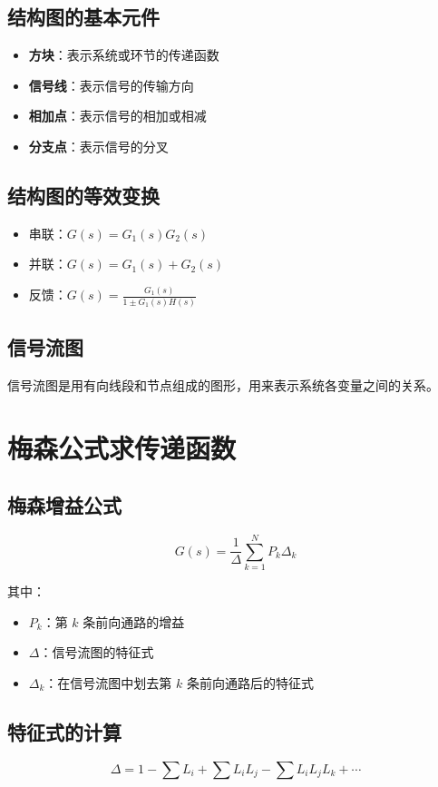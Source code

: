 \documentclass[12pt,a4paper]{article}
\begin{document}
\subsection{结构图的基本元件}
\begin{itemize}
    \item \textbf{方块}：表示系统或环节的传递函数
    \item \textbf{信号线}：表示信号的传输方向
    \item \textbf{相加点}：表示信号的相加或相减
    \item \textbf{分支点}：表示信号的分叉
\end{itemize}

\subsection{结构图的等效变换}
\begin{itemize}
    \item 串联：$G(s) = G_1(s)G_2(s)$
    \item 并联：$G(s) = G_1(s) + G_2(s)$
    \item 反馈：$G(s) = \frac{G_1(s)}{1 \pm G_1(s)H(s)}$
\end{itemize}

\subsection{信号流图}
信号流图是用有向线段和节点组成的图形，用来表示系统各变量之间的关系。

\section{梅森公式求传递函数}

\subsection{梅森增益公式}
\[G(s) = \frac{1}{\Delta} \sum_{k=1}^{N} P_k \Delta_k\]

其中：
\begin{itemize}
    \item $P_k$：第 $k$ 条前向通路的增益
    \item $\Delta$：信号流图的特征式
    \item $\Delta_k$：在信号流图中划去第 $k$ 条前向通路后的特征式
\end{itemize}

\subsection{特征式的计算}
\[\Delta = 1 - \sum L_i + \sum L_i L_j - \sum L_i L_j L_k + \cdots\]
\end{document}
